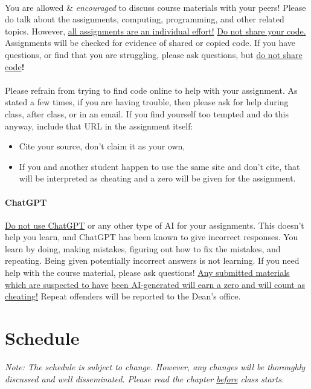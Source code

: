 \documentclass[letter,10pt]{article}
\begin{document}
\paragraph{}You are allowed \& \textit{encouraged} to discuss course materials with your peers! Please do talk about the assignments, computing, programming, and other related topics. However, \underline{all assignments are an individual effort!} \underline{Do not share your code.} Assignments will be checked for evidence of shared or copied code. If you have questions, or find that you are struggling, please ask questions, but \underline{do not share code}\textbf{!}

\paragraph{}Please refrain from trying to find code online to help with your assignment. As stated a few times, if you are having trouble, then please ask for help during class, after class, or in an email. If you find yourself too tempted and do this anyway, include that URL in the assignment itself:
\begin{itemize}
\item Cite your source, don't claim it as your own,
\item If you and another student happen to use the same site and don't cite, that will be interpreted as cheating and a zero will be given for the assignment.
\end{itemize}

\paragraph{ChatGPT} \underline{Do not use ChatGPT} or any other type of AI for your assignments. This doesn't help you learn, and ChatGPT has been known to give incorrect responses. You learn by doing, making mistakes, figuring out how to fix the mistakes, and repeating. Being given potentially incorrect answers is not learning. If you need help with the course material, please ask questions! \underline{Any submitted materials which are suspected to have} \underline{been AI-generated will earn a zero and will count as cheating!} Repeat offenders will be reported to the Dean's office.

\section*{Schedule}\label{sec:schedule}
\textit{Note: The schedule is subject to change. However, any changes will be thoroughly discussed and well disseminated. Please read the chapter \underline{before} class starts.}
\end{document}
